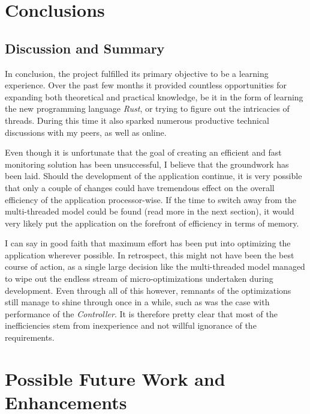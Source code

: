 \section{Conclusions}
    \subsection{Discussion and Summary}
        In conclusion, the project fulfilled its primary objective to be a learning experience. Over the past few months it provided countless opportunities for expanding both theoretical and practical knowledge, be it in the form of learning the new programming language \textit{Rust}, or trying to figure out the intricacies of threads. During this time it also sparked numerous productive technical discussions with my peers, as well as online.
        
        Even though it is unfortunate that the goal of creating an efficient and fast monitoring solution has been unsuccessful, I believe that the groundwork has been laid. Should the development of the application continue, it is very possible that only a couple of changes could have tremendous effect on the overall efficiency of the application processor-wise. If the time to switch away from the multi-threaded model could be found (read more in the next section), it would very likely put the application on the forefront of efficiency in terms of memory.
        
        I can say in good faith that maximum effort has been put into optimizing the application wherever possible. In retrospect, this might not have been the best course of action, as a single large decision like the multi-threaded model managed to wipe out the endless stream of micro-optimizations undertaken during development. Even through all of this however, remnants of the optimizations still manage to shine through once in a while, such as was the case with performance of the \textit{Controller}. It is therefore pretty clear that most of the inefficiencies stem from inexperience and not willful ignorance of the requirements.


        \clearpage
    

\section{Possible Future Work and Enhancements}\label{sec:future-work}
